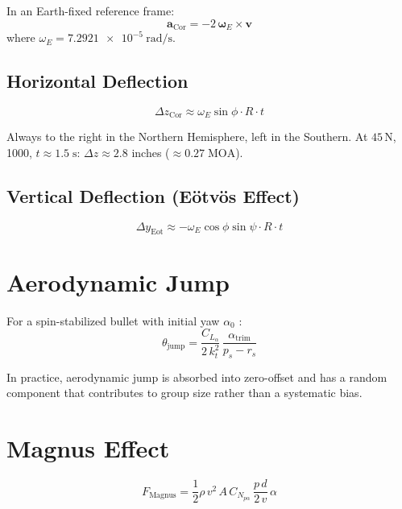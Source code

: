 \documentclass[11pt,twoside,openright]{report}
\newcommand{\vvec}{\bm{v}}
\newcommand{\avec}{\bm{a}}
\begin{document}
In an Earth-fixed reference frame:
\begin{equation}
  \avec_{\mathrm{Cor}} = -2\,\bm{\omega}_E \times \vvec
  \label{eq:coriolis}
\end{equation}
where $\omega_E = \SI{7.2921e-5}{\radian\per\second}$.

\subsection{Horizontal Deflection}

\begin{equation}
  \boxed{\Delta z_{\mathrm{Cor}} \approx \omega_E \sin\phi \cdot R \cdot t}
  \label{eq:coriolis_horiz}
\end{equation}

Always to the right in the Northern Hemisphere, left in the Southern. At $45\,\text{N}$, \SI{1000}{\yard}, $t \approx 1.5\;\text{s}$: $\Delta z \approx 2.8$ inches ($\approx 0.27\;\text{MOA}$).

\subsection{Vertical Deflection (E\"otv\"os Effect)}

\begin{equation}
  \Delta y_{\mathrm{Eot}} \approx -\omega_E \cos\phi\sin\psi \cdot R \cdot t
  \label{eq:eotvos}
\end{equation}

\section{Aerodynamic Jump}

For a spin-stabilized bullet with initial yaw $\alpha_0$ \citep{mccoy1999modern}:
\begin{equation}
  \theta_{\mathrm{jump}} = \frac{C_{L_\alpha}}{2\,k_t^2}\,\frac{\alpha_{\mathrm{trim}}}{p_s - r_s}
  \label{eq:aero_jump}
\end{equation}

In practice, aerodynamic jump is absorbed into zero-offset and has a random component that contributes to group size rather than a systematic bias.

\section{Magnus Effect}

\begin{equation}
  F_{\mathrm{Magnus}} = \frac{1}{2}\rho\,v^2\,A\,C_{N_{p\alpha}}\,\frac{p\,d}{2\,v}\,\alpha
  \label{eq:magnus}
\end{equation}
\end{document}

